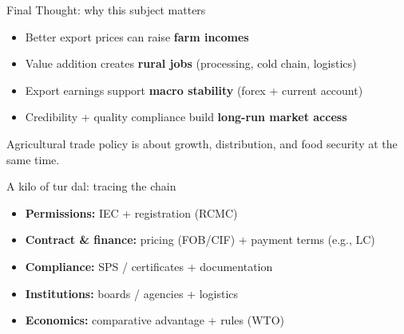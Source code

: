 \documentclass[
  ignorenonframetext,
  aspectratio=169,
]{beamer}
\makeatletter
\providecommand{\tightlist}{%
  \setlength{\itemsep}{0pt}\setlength{\parskip}{0pt}}
\let\quarto@originallabel\label
\DeclareRobustCommand*{\label}[1]{\quarto@originallabel{#1}}
\makeatother
\begin{document}
\begin{frame}
\begin{block}{Final Thought: why this subject matters}
\label{final-thought-why-this-subject-matters}
\begin{itemize}
\tightlist
\item
  Better export prices can raise \textbf{farm incomes}
\item
  Value addition creates \textbf{rural jobs} (processing, cold chain,
  logistics)
\item
  Export earnings support \textbf{macro stability} (forex + current
  account)
\item
  Credibility + quality compliance build \textbf{long-run market access}
\end{itemize}

Agricultural trade policy is about growth, distribution, and food
security at the same time.
\end{block}
\end{frame}

\begin{frame}
\begin{block}{A kilo of tur dal: tracing the chain}
\label{a-kilo-of-tur-dal-tracing-the-chain}
\begin{itemize}
\tightlist
\item
  \textbf{Permissions:} IEC + registration (RCMC)
\item
  \textbf{Contract \& finance:} pricing (FOB/CIF) + payment terms (e.g.,
  LC)
\item
  \textbf{Compliance:} SPS / certificates + documentation
\item
  \textbf{Institutions:} boards / agencies + logistics
\item
  \textbf{Economics:} comparative advantage + rules (WTO)
\end{itemize}

\end{block}
\end{frame}
\end{document}
